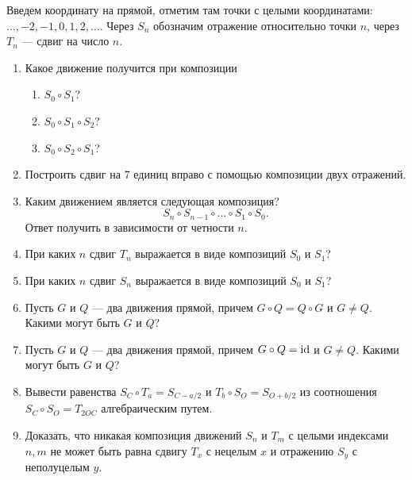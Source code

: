 Введем координату на прямой, отметим там точки с целыми координатами: $\dots,-2,-1,0,1,2,\dots$. Через $S_n$ обозначим отражение относительно точки $n$, через $T_n$ --- сдвиг на число $n$.
\begin{enumerate}
\item Какое движение получится при композиции
\begin{enumerate}
\item $S_0\circ S_1$?
\item $S_0\circ S_1\circ S_2$?
\item $S_0\circ S_2\circ S_1$?
\end{enumerate}
\item Построить сдвиг на 7 единиц вправо с помощью композиции двух отражений.
\item Каким движением является следующая композиция?
$$
S_{n}\circ S_{n-1}\circ \dots\circ S_{1}\circ S_0.
$$
Ответ получить в зависимости от четности $n$.
\item При каких $n$ сдвиг $T_n$ выражается в виде композиций $S_0$ и $S_1$?
\item При каких $n$ сдвиг $S_n$ выражается в виде композиций $S_0$ и $S_1$?
\item Пусть $G$ и $Q$ --- два движения прямой, причем $G\circ Q=Q\circ G$ и $G\ne Q$. Какими могут быть $G$ и $Q$?
\item Пусть $G$ и $Q$ --- два движения прямой, причем $G\circ Q=\mathrm{id}$ и $G\ne Q$. Какими могут быть $G$ и $Q$?
\item Вывести равенства $S_C\circ T_a = S_{C-a/2}$ и $T_b\circ S_O = S_{O+b/2}$ из соотношения $S_C\circ S_O=T_{2OC}$ алгебраическим путем.
\item Доказать, что никакая композиция движений $S_n$ и $T_m$ с целыми индексами $n,m$ не может быть равна сдвигу $T_x$ с нецелым $x$ и отражению $S_y$ с неполуцелым $y$.
\end{enumerate}

